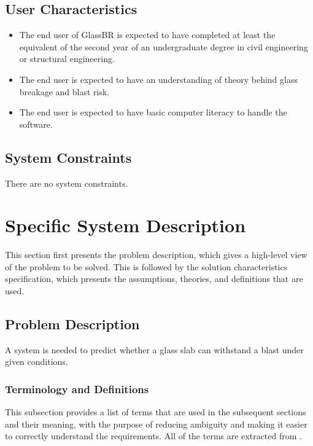 \documentclass[12pt]{article}
\begin{document}
\subsection{User Characteristics}
\label{Sec:UserChars}
\begin{itemize}
\item{The end user of GlassBR is expected to have completed at least the equivalent of the second year of an undergraduate degree in civil engineering or structural engineering.}
\item{The end user is expected to have an understanding of theory behind glass breakage and blast risk.}
\item{The end user is expected to have basic computer literacy to handle the software.}
\end{itemize}
\subsection{System Constraints}
\label{Sec:SysConstraints}
There are no system constraints.

\section{Specific System Description}
\label{Sec:SpecSystDesc}
This section first presents the problem description, which gives a high-level view of the problem to be solved. This is followed by the solution characteristics specification, which presents the assumptions, theories, and definitions that are used.

\subsection{Problem Description}
\label{Sec:ProbDesc}
A system is needed to predict whether a glass slab can withstand a blast under given conditions.

\subsubsection{Terminology and Definitions}
\label{Sec:TermDefs}
This subsection provides a list of terms that are used in the subsequent sections and their meaning, with the purpose of reducing ambiguity and making it easier to correctly understand the requirements. All of the terms are extracted from \cite{astm2009}.
\end{document}
